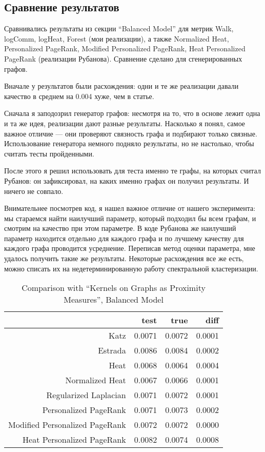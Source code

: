 \documentclass{article}
\begin{document}
\subsection{Сравнение результатов}
Сравнивались результаты из секции ``Balanced Model'' для метрик Walk, logComm, logHeat, Forest (мои реализации), а также Normalized Heat, Personalized PageRank, Modified Personalized PageRank, Heat Personalized PageRank (реализации Рубанова). Сравнение сделано для сгенерированных графов.

Вначале у результатов были расхождения: одни и те же реализации давали качество в среднем на 0.004 хуже, чем в статье.

Сначала я заподозрил генератор графов: несмотря на то, что в основе лежит одна и та же идея, реализации дают разные результаты. Насколько я понял, самое важное отличие --- они проверяют связность графа и подбирают только связные. Использование генератора немного подняло результаты, но не настолько, чтобы считать тесты пройденными.

После этого я решил использовать для теста именно те графы, на которых считал Рубанов: он зафиксировал, на каких именно графах он получил результаты. И ничего не совпало.

Внимательнее посмотрев код, я нашел важное отличие от нашего эксперимента: мы стараемся найти наилучший параметр, который подходил бы всем графам, и смотрим на качество при этом параметре. В коде Рубанова же наилучший параметр находится отдельно для каждого графа и по лучшему качеству для каждого графа проводится усреднение. Переписав метод оценки параметра, мне удалось получить такие же результаты. Некоторые расхождения все же есть, можно списать их на недетерминированную работу спектральной кластеризации.

\begin{table}[H]
\centering
\caption{Comparison with ``Kernels on Graphs as Proximity Measures'', Balanced Model}
\label{my-label}
\begin{tabular}{r|rrr}
                               & test   & true   & diff   \\
                               \hline
Katz                           & 0.0071 & 0.0072 & 0.0001 \\
Estrada                        & 0.0086 & 0.0084 & 0.0002 \\
Heat                           & 0.0068 & 0.0064 & 0.0004 \\
Normalized Heat                & 0.0067 & 0.0066 & 0.0001 \\
Regularized Laplacian          & 0.0071 & 0.0072 & 0.0001 \\
Personalized PageRank          & 0.0071 & 0.0073 & 0.0002 \\
Modified Personalized PageRank & 0.0072 & 0.0072 & 0.0000 \\
Heat Personalized PageRank     & 0.0082 & 0.0074 & 0.0008
\end{tabular}
\end{table}
\end{document}
